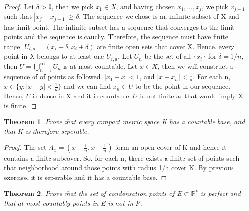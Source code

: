 \documentclass{article}
\theoremstyle{plain}
\newtheorem{theorem}{Theorem}
\theoremstyle{definition}
\begin{document}
\begin{proof}
	Let $\delta > 0$, then we pick $x_{1} \in X$, and having chosen $x_{1},...,x_{j}$, we pick $x_{j + 1}$ such that $|x_{j} - x_{j + 1}| \geq \delta$. The sequence we chose is an infinite subset of X and has limit point. The infinite subset has a sequence that converges to the limit points and the sequence is cauchy. Therefore, the sequence  must have finite range. $U_{i,n} = (x_{i} - \delta, x_{i} + \delta)$ are finite open sets that cover X. Hence, every point in X belongs to at least one $U_{i,n}$. Let $U_{n}$ be the set of all $\{ x_{i} \}$ for $\delta = 1/n$, then $U = \bigcup_{n = 1}^{\infty} U_{n}$ is at most countable. Let $x \in X$, then we will construct a sequence of of points as followed. $|x_{1} - x| < 1$, and $|x - x_{n}| < \frac{1}{n}$. For each n, $x \in \{ y : |x - y | < \frac{1}{n} \}$ and we can find $x_{n} \in U$ to be the point in our sequence. Hence, $U$ is dense in X and it is countable. $U$ is not finite as that would imply X is finite. 
\end{proof}

\begin{theorem}
	Prove that every compact metric space K has a countable base, and that K is therefore seperable.
\end{theorem}

\begin{proof}
	The set $A_{x} = ( x - \frac{1}{n}, x + \frac{1}{n})$ form an open cover of K and hence it contains a finite subcover. So, for each n, there exists a finite set of points such that neighborhood around those points with radius 1/n cover K. By previous exercise, it is seperable and it has a countable base.
\end{proof}

\begin{theorem}
	Prove that the set of condensation points of $E \subset \mathbb{R}^{k}$ is perfect and that at most countably points in E is not in P.
\end{theorem}
\end{document}
